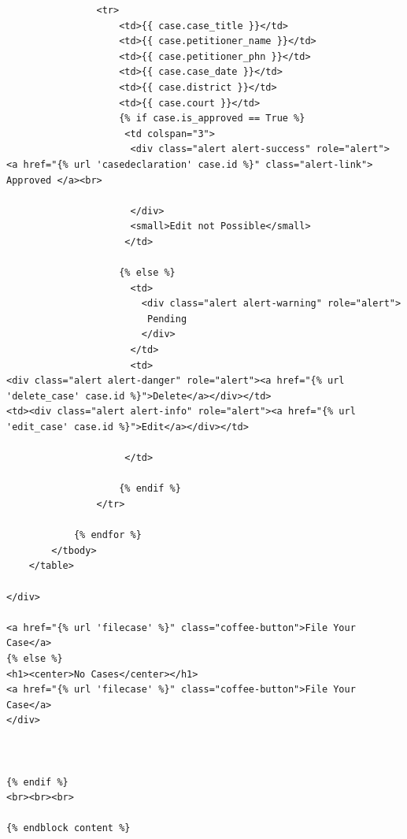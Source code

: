 \begin{verbatim}
                <tr>
                    <td>{{ case.case_title }}</td>
                    <td>{{ case.petitioner_name }}</td>
                    <td>{{ case.petitioner_phn }}</td>
                    <td>{{ case.case_date }}</td>
                    <td>{{ case.district }}</td>
                    <td>{{ case.court }}</td>
                    {% if case.is_approved == True %}
                     <td colspan="3">
                      <div class="alert alert-success" role="alert">
<a href="{% url 'casedeclaration' case.id %}" class="alert-link"> Approved </a><br>
                          
                      </div>
                      <small>Edit not Possible</small>
                     </td>
                     
                    {% else %}
                      <td>
                        <div class="alert alert-warning" role="alert">
                         Pending
                        </div>
                      </td>
                      <td>
<div class="alert alert-danger" role="alert"><a href="{% url 'delete_case' case.id %}">Delete</a></div></td>
<td><div class="alert alert-info" role="alert"><a href="{% url 'edit_case' case.id %}">Edit</a></div></td>
                      
                     </td>
                      
                    {% endif %}
                </tr>
                
            {% endfor %}
        </tbody>
    </table>
    
</div>

<a href="{% url 'filecase' %}" class="coffee-button">File Your Case</a>
{% else %}
<h1><center>No Cases</center></h1>
<a href="{% url 'filecase' %}" class="coffee-button">File Your Case</a>
</div>



{% endif %}
<br><br><br>

{% endblock content %}
\end{verbatim}
